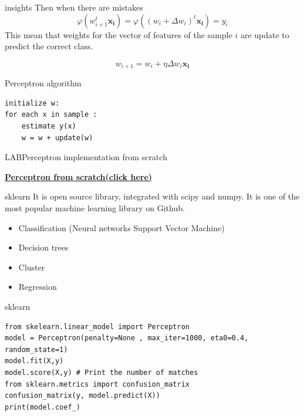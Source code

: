 \documentclass{beamer}
\begin{document}
\begin{frame}{insights}
Then when there are mistakes 
\begin{equation}
\varphi(w^{t}_{i+1} \mathbf{x_{i}}) =\varphi((w_{i} + \Delta w_{i})^{t} \mathbf{ x_{i}}) = y_{i} 
\end{equation}
This mean that  weights for the vector of features of the sample $i$ are update to predict the correct class.
 
\begin{equation}
w_{i+1} = w_{i} + \eta \Delta w_{i} \mathbf{x_{i}}
\end{equation}

\end{frame}


\begin{frame}[fragile]{Perceptron algorithm}
\begin{verbatim}
initialize w:
for each x in sample :
	estimate y(x)
	w = w + update(w)
\end{verbatim}
\end{frame}

\begin{frame}{LAB}{Perceptron implementation from scratch}
\begin{Large}
\textbf{
\href{https://colab.research.google.com/drive/13yt7cav6wZbMrmwGxjxzPKwgo5636YUj?usp=sharing}{Perceptron from scratch(click here)}}
\end{Large}
\end{frame}



\begin{frame}{sklearn}
It is open source library, integrated with scipy and numpy. It is one of the most popular machine learning library on Github. 

\begin{itemize}
\item Classification  (Neural networks
 Support Vector Machine)
\item Decision trees
\item Cluster
\item Regression
\end{itemize} 

\end{frame}

\begin{frame}[fragile]{sklearn}
\begin{lstlisting}
from skelearn.linear_model import Perceptron
model = Perceptron(penalty=None , max_iter=1000, eta0=0.4, random_state=1)
model.fit(X,y)
model.score(X,y) # Print the number of matches
from sklearn.metrics import confusion_matrix
confusion_matrix(y, model.predict(X))
print(model.coef_)
\end{lstlisting}
\end{frame}
\end{document}
